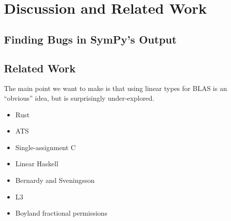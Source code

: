 \section{Discussion and Related Work}\label{sec:discussion_related_work}

\subsection{Finding Bugs in SymPy's Output}


\subsection{Related Work}

The main point we want to make is that using linear types for BLAS
is an ``obvious'' idea, but is surprisingly under-explored. 

\begin{itemize}
\item Rust
\item ATS
\item Single-assignment C 
\item Linear Haskell
\item Bernardy and Sveningsson
\item L3
\item Boyland fractional permissions
\end{itemize}


